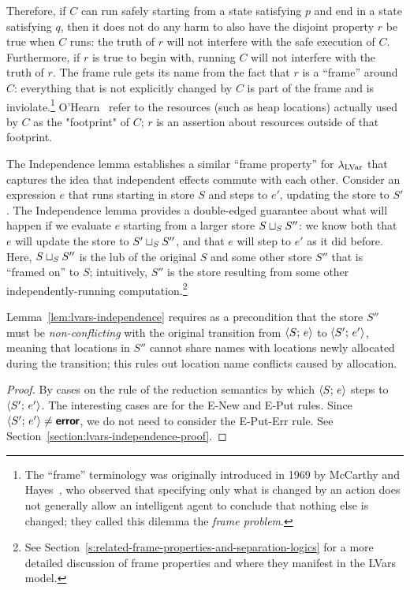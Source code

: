 Therefore, if $C$ can run safely starting from a state satisfying $p$
and end in a state satisfying $q$, then it does not do any harm to
also have the disjoint property $r$ be true when $C$ runs: the truth
of $r$ will not interfere with the safe execution of $C$.
Furthermore, if $r$ is true to begin with, running $C$ will not
interfere with the truth of $r$.  The frame rule gets its name from
the fact that $r$ is a ``frame'' around $C$: everything that is not
explicitly changed by $C$ is part of the frame and is
inviolate.\footnote{The ``frame'' terminology was originally
  introduced in 1969 by McCarthy and Hayes~\cite{McCarthyHayesFrame},
  who observed that specifying only what is changed by an action does
  not generally allow an intelligent agent to conclude that nothing
  else is changed; they called this dilemma the \emph{frame problem}.}
O'Hearn \etal~refer to the resources (such as heap locations) actually
used by $C$ as the "footprint" of $C$; $r$ is an assertion about
resources outside of that footprint.

The Independence lemma establishes a similar ``frame property'' for
$\lambda_{\textrm{LVar}}$ that captures the idea that independent effects commute
with each other.  Consider an expression $e$ that runs starting in
store $S$ and steps to $e'$, updating the store to $S'$.  The
Independence lemma provides a double-edged guarantee about what will
happen if we evaluate $e$ starting from a larger store
$S \sqcup_{S} S''$: we know both that $e$ will update the store to
$S' \sqcup_{S} S''$, and that $e$ will step to $e'$ as it did before.
Here, $S \sqcup_{S} S''$ is the lub of the original $S$ and some
other store $S''$ that is ``framed on'' to $S$; intuitively, $S''$ is
the store resulting from some other independently-running
computation.\footnote{See
  Section~\ref{s:related-frame-properties-and-separation-logics} for a
  more detailed discussion of frame properties and where they manifest
  in the LVars model.}

Lemma~\ref{lem:lvars-independence} requires as a precondition that the
store $S''$ must be \emph{non-conflicting} with the original
transition from $\langle S;\, e \rangle$ to $\langle S';\, e' \rangle$, meaning that
locations in $S''$ cannot share names with locations newly allocated
during the transition; this rules out location name conflicts caused
by allocation.

\LVarsDefNonConflicting

\LVarsLemIndependence
\begin{proof}
  By cases on the rule of the reduction semantics by which
  $\langle S;\, e \rangle$ steps to $\langle S';\, e' \rangle$. The interesting cases
  are for the {\sc E-New} and {\sc E-Put} rules.  Since
  $\langle S';\, e' \rangle \neq \textbf{\textsf{error}}$, we do not need to consider the {\sc
    E-Put-Err} rule.  See
  Section~\ref{section:lvars-independence-proof}.
\end{proof}

